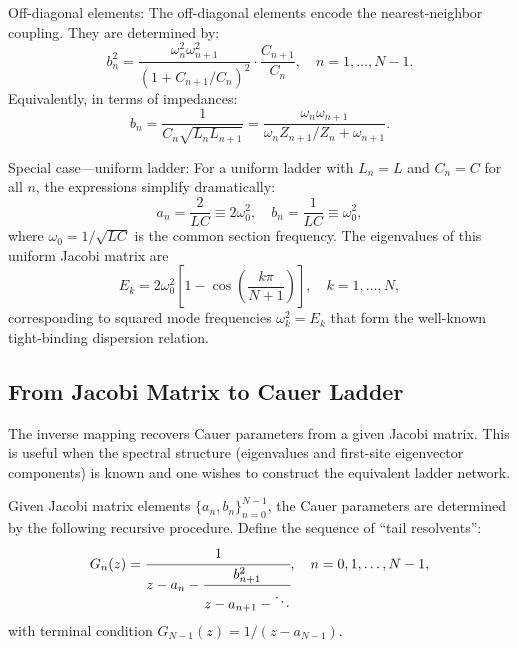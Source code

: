 \documentclass[reprint, floatfix, superscriptaddress, amsmath, amssymb, longbibliography]{revtex4-2}
\begin{document}
{Off-diagonal elements:} The off-diagonal elements encode the nearest-neighbor coupling. They are determined by:
\begin{equation}
b_n^2 =  \frac{\omega_n^2 \omega_{n+1}^2}{(1 + C_{n+1}/C_n)^2} \cdot \frac{C_{n+1}}{C_n}, \quad n = 1, \ldots, N-1.
\label{eq:jacobi_offdiag}
\end{equation}
Equivalently, in terms of impedances:
\begin{equation}
b_n = \frac{1}{C_n \sqrt{L_n L_{n+1}}} = \frac{\omega_n \omega_{n+1}}{\omega_n Z_{n+1}/Z_n + \omega_{n+1}}.
\label{eq:jacobi_offdiag_alt}
\end{equation}

{Special case---uniform ladder:} For a uniform ladder with $L_n = L$ and $C_n = C$ for all $n$, the expressions simplify dramatically:
\begin{equation}
a_n = \frac{2}{LC} \equiv 2\omega_0^2, \quad b_n = \frac{1}{LC} \equiv \omega_0^2,
\label{eq:uniform_jacobi}
\end{equation}
where $\omega_0 = 1/\sqrt{LC}$ is the common section frequency. The eigenvalues of this uniform Jacobi matrix are
\begin{equation}
E_k = 2\omega_0^2\left[1 - \cos\left(\frac{k\pi}{N+1}\right)\right], \quad k = 1, \ldots, N,
\label{eq:uniform_eigenvalues}
\end{equation}
corresponding to squared mode frequencies $\omega_k^2 = E_k$ that form the well-known tight-binding dispersion relation.

\subsection{From Jacobi Matrix to Cauer Ladder}
\label{app:jacobi_to_cauer}

The inverse mapping recovers Cauer parameters from a given Jacobi matrix. This is useful when the spectral structure (eigenvalues and first-site eigenvector components) is known and one wishes to construct the equivalent ladder network.

Given Jacobi matrix elements $\{a_n, b_n\}_{n=0}^{N-1}$, the Cauer parameters are determined by the following recursive procedure. Define the sequence of ``tail resolvents'':
\begin{equation}
G_n(z) = \cfrac{1}{z - a_n - \cfrac{b_{n+1}^2}{z - a_{n+1} - \ddots}}, \quad n = 0, 1, \ldots, N-1,
\label{eq:tail_resolvent}
\end{equation}
with terminal condition $G_{N-1}(z) = 1/(z - a_{N-1})$.
\end{document}

